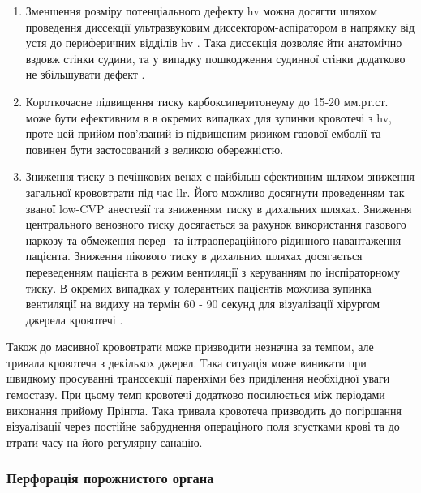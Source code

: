 \begin{refsection}
\begin{itemize}
    \begin{enumerate}
        \item Зменшення розміру потенціального дефекту \acrshort{hv} можна досягти шляхом проведення диссекції ультразвуковим диссектором-аспіратором в напрямку від устя до периферичних відділів \acrshort{hv} . Така диссекція дозволяє йти анатомічно вздовж стінки судини, та у випадку пошкодження судинної стінки додатково не збільшувати дефект \cite{Honda2020}.  
        
        \item Короткочасне підвищення тиску карбоксиперитонеуму до 15-20 мм.рт.ст. може бути ефективним в в окремих випадках для зупинки кровотечі з \acrshort{hv}, проте цей прийом пов'язаний із підвищеним ризиком газової емболії \cite{Otsuka2013, Cassai2019} та повинен бути застосований з великою обережністю.
        
        \item Зниження тиску в печінкових венах є найбільш ефективним шляхом зниження загальної крововтрати під час \acrshort{llr}. Його можливо досягнути проведенням так званої low-CVP анестезії та зниженням тиску в дихальних шляхах. Зниження центрального венозного тиску досягається за рахунок використання газового наркозу та обмеження перед- та інтраопераційного рідинного навантаження пацієнта. Зниження пікового тиску в дихальних шляхах досягається переведенням пацієнта в режим вентиляції з керуванням по інспіраторному тиску. В окремих випадках у толерантних пацієнтів можлива зупинка вентиляції на видиху на термін 60 - 90 секунд для візуалізації хірургом джерела кровотечі \cite{Kobayashi2016}.
    \end{enumerate}
    
\end{itemize}

Також до масивної крововтрати може призводити незначна за темпом, але тривала кровотеча з декількох джерел. Така ситуація може виникати при швидкому просуванні транссекції паренхіми без приділення необхідної уваги гемостазу. При цьому темп кровотечі додатково посилюється між періодами виконання прийому Прінгла. Така тривала кровотеча призводить до погіршання візуалізації через постійне забруднення операціного поля згустками крові та до втрати часу на його регулярну санацію. 


\subsubsection{Перфорація порожнистого органа}


\end{refsection}
